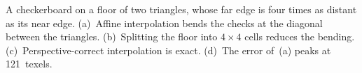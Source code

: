 \centering
\captionsetup{hypcap=false}%
%
\caption{
    A checkerboard on a floor of two triangles, whose far edge is four times as distant as its near edge.
    (a)~Affine interpolation bends the checks at the diagonal between the triangles.
    (b)~Splitting the floor into $4\times4$ cells reduces the bending.
    (c)~Perspective-correct interpolation is exact.
    (d)~The error of~(a) peaks at 121~texels.
}%
\label{fig:Teaser}
